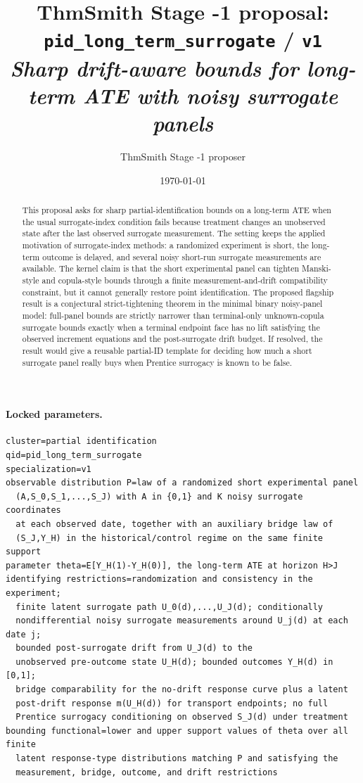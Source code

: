 \documentclass[11pt]{article}
\title{ThmSmith Stage -1 proposal: \texttt{pid\_long\_term\_surrogate} / \texttt{v1}%
  \\ \large\textit{Sharp drift-aware bounds for long-term ATE with noisy surrogate panels}}
\author{ThmSmith Stage -1 proposer}
\date{\today}
\theoremstyle{definition}
\theoremstyle{plain}
\theoremstyle{remark}
\begin{document}
\maketitle


\paragraph{Locked parameters.}
\begin{verbatim}
cluster=partial identification
qid=pid_long_term_surrogate
specialization=v1
observable distribution P=law of a randomized short experimental panel
  (A,S_0,S_1,...,S_J) with A in {0,1} and K noisy surrogate coordinates
  at each observed date, together with an auxiliary bridge law of
  (S_J,Y_H) in the historical/control regime on the same finite support
parameter theta=E[Y_H(1)-Y_H(0)], the long-term ATE at horizon H>J
identifying restrictions=randomization and consistency in the experiment;
  finite latent surrogate path U_0(d),...,U_J(d); conditionally
  nondifferential noisy surrogate measurements around U_j(d) at each date j;
  bounded post-surrogate drift from U_J(d) to the
  unobserved pre-outcome state U_H(d); bounded outcomes Y_H(d) in [0,1];
  bridge comparability for the no-drift response curve plus a latent
  post-drift response m(U_H(d)) for transport endpoints; no full
  Prentice surrogacy conditioning on observed S_J(d) under treatment
bounding functional=lower and upper support values of theta over all finite
  latent response-type distributions matching P and satisfying the
  measurement, bridge, outcome, and drift restrictions
\end{verbatim}

\begin{abstract}
This proposal asks for sharp partial-identification bounds on a long-term ATE when the usual surrogate-index condition fails because treatment changes an unobserved state after the last observed surrogate measurement.  The setting keeps the applied motivation of surrogate-index methods: a randomized experiment is short, the long-term outcome is delayed, and several noisy short-run surrogate measurements are available.  The kernel claim is that the short experimental panel can tighten Manski-style and copula-style bounds through a finite measurement-and-drift compatibility constraint, but it cannot generally restore point identification.  The proposed flagship result is a conjectural strict-tightening theorem in the minimal binary noisy-panel model: full-panel bounds are strictly narrower than terminal-only unknown-copula surrogate bounds exactly when a terminal endpoint face has no lift satisfying the observed increment equations and the post-surrogate drift budget.  If resolved, the result would give a reusable partial-ID template for deciding how much a short surrogate panel really buys when Prentice surrogacy is known to be false.
\end{abstract}
\end{document}
